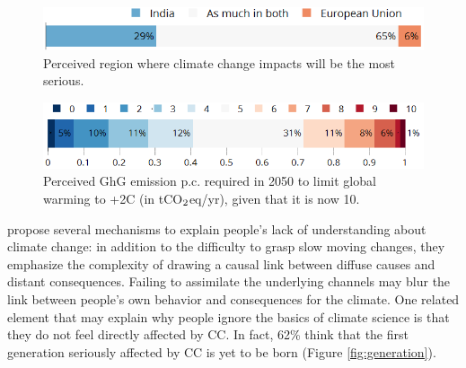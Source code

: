 \documentclass[english,5p,authoryear]{elsarticle}
\begin{document}
\begin{figure}[t]
\centering
\includegraphics[width=\columnwidth]{Images/CC_region_nolegend.png}
\caption{Perceived region where climate change impacts will be the most serious.}
\label{fig:region}
\end{figure}

\begin{figure}[t]
\centering
\includegraphics[width=\columnwidth]{Images/CC_target_emission_nolegend.png}
\caption{Perceived GhG emission p.c. required in 2050 to limit global warming to +2\textdegree{}C (in tCO$_\textnormal{2}$eq/yr), given that it is now 10.}
\label{fig:target_emission}
\end{figure}

\citet{millner_beliefs_2016} propose several mechanisms to explain people's lack of understanding about climate change: in addition to the difficulty to grasp slow moving changes, they emphasize the complexity of drawing a causal link between diffuse causes and distant consequences. Failing to assimilate the underlying channels may blur the link between people's own behavior and consequences for the climate. One related element that may explain why people ignore the basics of climate science is that they do not feel directly affected by CC. In fact, 62\% think that the first generation seriously affected by CC is yet to be born (Figure \ref{fig:generation}). %
\end{document}
